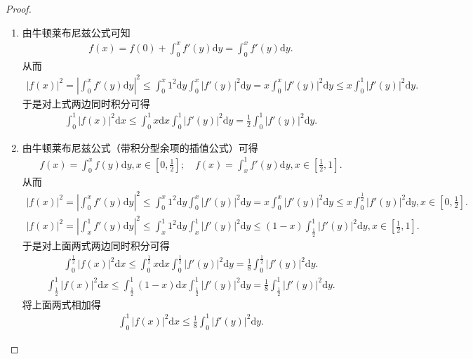 \documentclass[../../main.tex]{subfiles}%
\begin{document}
\begin{proof}
\begin{enumerate}
\item 由牛顿莱布尼兹公式可知
\begin{align*}
f(x) = f(0) + \int_{0}^{x}f'(y)\mathrm{d}y=\int_{0}^{x}f'(y)\mathrm{d}y.
\end{align*}
从而
\begin{align*}
|f(x)|^2 = \left| \int_{0}^{x}f'(y)\mathrm{d}y \right|^2 \leqslant \int_{0}^{x}1^2\mathrm{d}y \int_{0}^{x}|f'(y)|^2\mathrm{d}y = x\int_{0}^{x}|f'(y)|^2\mathrm{d}y \leqslant x\int_{0}^{1}|f'(y)|^2\mathrm{d}y.
\end{align*}
于是对上式两边同时积分可得
\begin{align*}
\int_{0}^{1}|f(x)|^2\mathrm{d}x \leqslant \int_{0}^{1}x\mathrm{d}x \int_{0}^{1}|f'(y)|^2\mathrm{d}y = \frac{1}{2}\int_{0}^{1}|f'(y)|^2\mathrm{d}y.
\end{align*}

\item 由牛顿莱布尼兹公式（带积分型余项的插值公式）可得
\begin{align*}
f(x) = \int_{0}^{x}f(y)\mathrm{d}y, x \in \left[0, \frac{1}{2}\right]; \quad f(x) = \int_{x}^{1}f'(y)\mathrm{d}y, x \in \left[\frac{1}{2}, 1\right].
\end{align*}
从而
\begin{align*}
|f(x)|^2 = \left| \int_{0}^{x}f'(y)\mathrm{d}y \right|^2 \leqslant \int_{0}^{x}1^2\mathrm{d}y\int_{0}^{x}|f'(y)|^2\mathrm{d}y = x\int_{0}^{x}|f'(y)|^2\mathrm{d}y \leqslant x\int_{0}^{\frac{1}{2}}|f'(y)|^2\mathrm{d}y, x \in \left[0, \frac{1}{2}\right].
\end{align*}
\begin{align*}
|f(x)|^2=\left| \int_x^1{f' (y)\mathrm{d}y} \right|^2\leqslant \int_x^1{1^2\mathrm{d}y\int_x^1{|f' (y)|^2\mathrm{d}y}}\leqslant (1-x)\int_{\frac{1}{2}}^1{|f' (y)|^2\mathrm{d}y,x}\in \left[ \frac{1}{2},1 \right] .
\end{align*}
于是对上面两式两边同时积分可得
\begin{align*}
\int_{0}^{\frac{1}{2}}|f(x)|^2\mathrm{d}x \leqslant \int_{0}^{\frac{1}{2}}x\mathrm{d}x\int_{0}^{\frac{1}{2}}|f'(y)|^2\mathrm{d}y = \frac{1}{8}\int_{0}^{\frac{1}{2}}|f'(y)|^2\mathrm{d}y.
\end{align*}
\begin{align*}
\int_{\frac{1}{2}}^{1}|f(x)|^2\mathrm{d}x \leqslant \int_{\frac{1}{2}}^{1}(1 - x)\mathrm{d}x\int_{\frac{1}{2}}^{1}|f'(y)|^2\mathrm{d}y = \frac{1}{8}\int_{\frac{1}{2}}^{1}|f'(y)|^2\mathrm{d}y.
\end{align*}
将上面两式相加得
\begin{align*}
\int_{0}^{1}|f(x)|^2\mathrm{d}x \leqslant \frac{1}{8}\int_{0}^{1}|f'(y)|^2\mathrm{d}y.
\end{align*}
\end{enumerate}
\end{proof}
\end{document}
